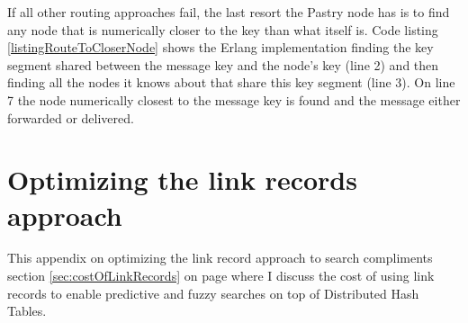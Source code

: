 

If all other routing approaches fail, the last resort the Pastry node has is to find any node that is numerically closer to the key than what itself is. Code listing \ref{listingRouteToCloserNode} shows the Erlang implementation finding the key segment shared between the message key and the node's key (line 2) and then finding all the nodes it knows about that share this key segment (line 3). On line 7 the node numerically closest to the message key is found and the message either forwarded or delivered.




\chapter{Optimizing the link records approach}
\label{sec:appendixLinkRecords}
This appendix on optimizing the link record approach to search compliments section \ref{sec:costOfLinkRecords} on page \pageref{sec:costOfLinkRecords} where I discuss the cost of using link records to enable predictive and fuzzy searches on top of Distributed Hash Tables.

\mbox{}

